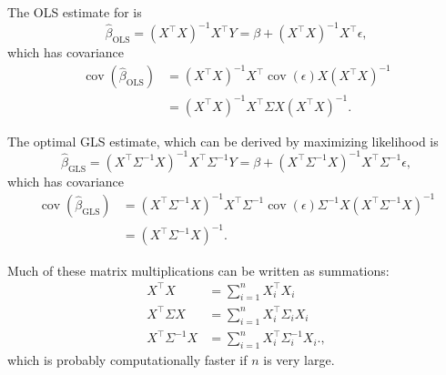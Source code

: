 \documentclass[11pt, letterpaper]{article}
\begin{document}
\begin{enumerate}[(a)]
\begin{description}
  The OLS estimate for is
  \begin{equation}
    \hat{\beta}_{\mathrm{OLS}} = \left(X^{\intercal}X\right)^{-1}X^\intercal Y
    = \beta + \left(X^{\intercal}X\right)^{-1}X^\intercal \epsilon,
  \end{equation}
  which has covariance
  \begin{align}
    \operatorname{cov}\left(\hat{\beta}_{\mathrm{OLS}}\right)
    &= \left(X^{\intercal}X\right)^{-1}X^\intercal
    \operatorname{cov}\left(\epsilon\right)
      X\left(X^{\intercal}X\right)^{-1} \nonumber\\
    &= \left(X^{\intercal}X\right)^{-1}X^\intercal
      \Sigma
      X\left(X^{\intercal}X\right)^{-1}.
      \label{eqn:p2_beta_hat_ols}
  \end{align}

  The optimal GLS estimate, which can be derived by maximizing likelihood is
  \begin{equation}
    \hat{\beta}_{\mathrm{GLS}} = \left(X^{\intercal}\Sigma^{-1}X\right)^{-1}X^\intercal\Sigma^{-1} Y
    = \beta + \left(X^{\intercal}\Sigma^{-1}X\right)^{-1}X^\intercal\Sigma^{-1} \epsilon,
  \end{equation}
  which has covariance
  \begin{align}
    \operatorname{cov}\left(\hat{\beta}_{\mathrm{GLS}}\right)
    &= \left(X^{\intercal}\Sigma^{-1}X\right)^{-1}X^\intercal
      \Sigma^{-1}
      \operatorname{cov}
      \left(\epsilon\right)
      \Sigma^{-1}
      X\left(X^{\intercal}\Sigma^{-1}X\right)^{-1} \nonumber\\
    &= \left(X^{\intercal}\Sigma^{-1}X\right)^{-1}.
      \label{eqn:p2_beta_hat_gls}
  \end{align}

  Much of these matrix multiplications can be written as summations:
  \begin{align*}
    X^\intercal X
    &= \sum_{i=1}^n X_i^\intercal X_i \\
    X^\intercal \Sigma X
    &= \sum_{i=1}^n X_i^\intercal \Sigma_i X_i \\
    X^\intercal \Sigma^{-1} X
    &= \sum_{i=1}^n X_i^\intercal \Sigma_i^{-1} X_i.,
  \end{align*}
  which is probably computationally faster if $n$ is very large.


\end{description}
\end{enumerate}
\end{document}
